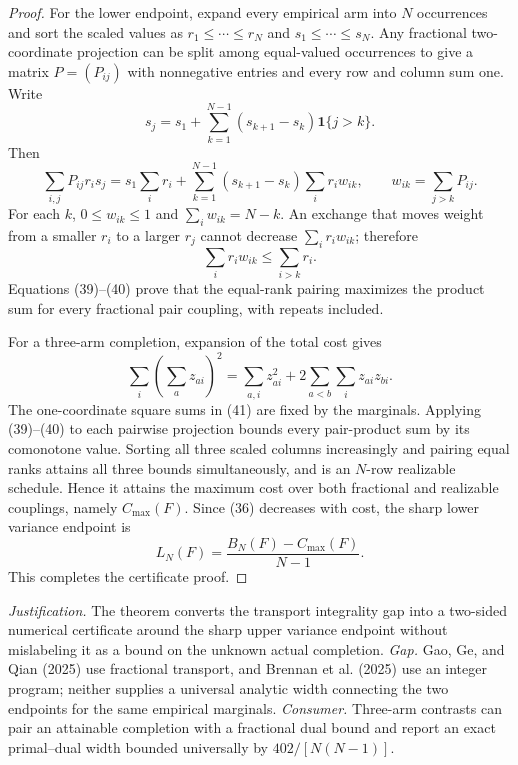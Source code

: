 \documentclass{article}
\begin{document}
\begin{proof}
For the lower endpoint, expand every empirical arm into \(N\) occurrences and sort the scaled values as \(r_1\le\cdots\le r_N\) and \(s_1\le\cdots\le s_N\).  Any fractional two-coordinate projection can be split among equal-valued occurrences to give a matrix \(P=(P_{ij})\) with nonnegative entries and every row and column sum one.  Write
\[
 s_j=s_1+\sum_{k=1}^{N-1}(s_{k+1}-s_k)\mathbf1\{j>k\}.
\]
Then
\[
 \sum_{i,j}P_{ij}r_is_j
 =s_1\sum_ir_i+
 \sum_{k=1}^{N-1}(s_{k+1}-s_k)\sum_i r_iw_{ik},
 \qquad w_{ik}=\sum_{j>k}P_{ij}. \tag{39}
\]
For each \(k\), \(0\le w_{ik}\le1\) and \(\sum_iw_{ik}=N-k\).  An exchange that moves weight from a smaller \(r_i\) to a larger \(r_j\) cannot decrease \(\sum_i r_iw_{ik}\); therefore
\[
 \sum_i r_iw_{ik}\le\sum_{i>k}r_i. \tag{40}
\]
Equations (39)--(40) prove that the equal-rank pairing maximizes the product sum for every fractional pair coupling, with repeats included.

For a three-arm completion, expansion of the total cost gives
\[
 \sum_i\left(\sum_az_{ai}\right)^2
 =\sum_{a,i}z_{ai}^2+2\sum_{a<b}\sum_i z_{ai}z_{bi}. \tag{41}
\]
The one-coordinate square sums in (41) are fixed by the marginals.  Applying (39)--(40) to each pairwise projection bounds every pair-product sum by its comonotone value.  Sorting all three scaled columns increasingly and pairing equal ranks attains all three bounds simultaneously, and is an \(N\)-row realizable schedule.  Hence it attains the maximum cost over both fractional and realizable couplings, namely \(C_{\max}(F)\).  Since (36) decreases with cost, the sharp lower variance endpoint is
\[
 L_N(F)=\frac{B_N(F)-C_{\max}(F)}{N-1}.
\]
This completes the certificate proof.
\end{proof}
\par\smallskip\noindent \textit{Justification.} The theorem converts the transport integrality gap into a two-sided numerical certificate around the sharp upper variance endpoint without mislabeling it as a bound on the unknown actual completion. \textit{Gap.} Gao, Ge, and Qian (2025) use fractional transport, and Brennan et al. (2025) use an integer program; neither supplies a universal analytic width connecting the two endpoints for the same empirical marginals. \textit{Consumer.} Three-arm contrasts can pair an attainable completion with a fractional dual bound and report an exact primal--dual width bounded universally by \(402/[N(N-1)]\).
\end{document}
